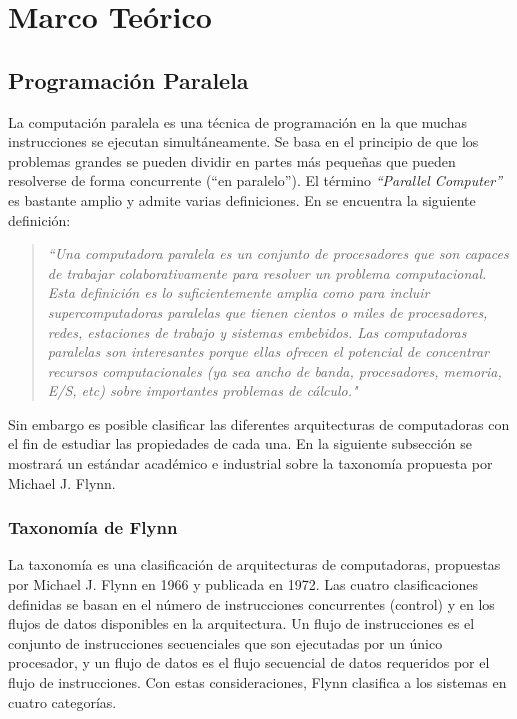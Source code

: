 \chapter{Marco Teórico}
\label{chap:marco_teorico}

\section{Programación Paralela}

La computación paralela es una técnica de programación en la que muchas instrucciones se ejecutan
simultáneamente\cite{Lorin:1990:RHP:1011116.1011127}. Se basa en el principio de que los problemas grandes se pueden dividir en partes más
pequeñas que pueden resolverse de forma concurrente (``en paralelo''). El término \textit{``Parallel Computer''} es bastante amplio y admite
varias definiciones. En \cite{parallel} se encuentra la siguiente definición:

\begin{quote}
\textit{``Una computadora paralela es un conjunto de procesadores que son capaces de trabajar colaborativamente para resolver un problema
computacional. Esta definición es lo suficientemente amplia como para incluir supercomputadoras paralelas que tienen cientos o miles de
procesadores, redes, estaciones de trabajo y sistemas embebidos. Las computadoras paralelas son interesantes porque ellas ofrecen el
potencial de concentrar recursos computacionales (ya sea ancho de banda, procesadores, memoria, E/S, etc) sobre importantes problemas de
cálculo."}
\end{quote}

Sin embargo es posible clasificar las diferentes arquitecturas de computadoras con el fin de estudiar las propiedades de cada una. En la
siguiente subsección se mostrará un estándar académico e industrial sobre la taxonomía propuesta por Michael J. Flynn.

\subsection{Taxonomía de Flynn}

La taxonomía es una clasificación de arquitecturas de computadoras, propuestas por Michael J. Flynn en 1966 y publicada en 1972\cite{flynn}.
Las cuatro clasificaciones definidas se basan en el número de instrucciones concurrentes (control) y en los flujos de datos disponibles en
la arquitectura. Un flujo de instrucciones es el conjunto de instrucciones secuenciales que son ejecutadas por un único procesador, y un
flujo de datos es el flujo secuencial de datos requeridos por el flujo de instrucciones. Con estas consideraciones, Flynn clasifica a los
sistemas en cuatro categorías.

